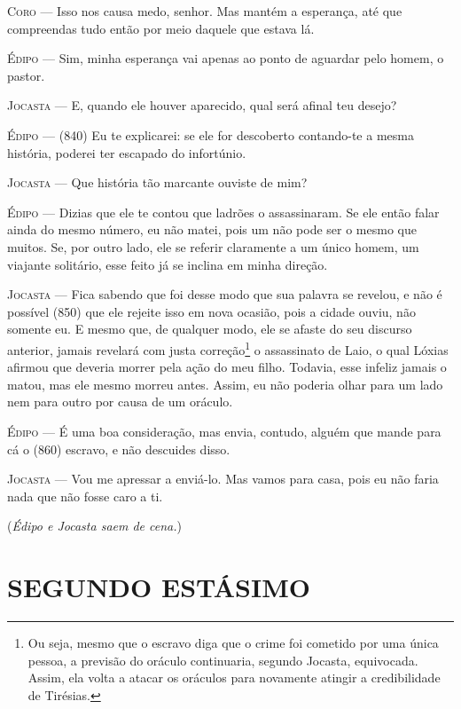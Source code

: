 \textsc{Coro} --- Isso nos causa medo, senhor. Mas mantém a esperança, até que compreendas
tudo então por meio daquele que estava lá.

\textsc{Édipo} --- Sim, minha esperança vai apenas ao ponto de aguardar pelo homem, o
pastor.

\textsc{Jocasta} --- E, quando ele houver aparecido, qual será afinal teu desejo?

\textsc{Édipo} --- (840) Eu te explicarei: se ele for descoberto contando-te a mesma
história, poderei ter escapado do infortúnio.

\textsc{Jocasta} --- Que história tão marcante ouviste de mim?

\textsc{Édipo} --- Dizias que ele te contou que ladrões o assassinaram. Se ele então falar
ainda do mesmo número, eu não matei, pois um não pode ser o mesmo que
muitos. Se, por outro lado, ele se referir claramente a um único homem,
um viajante solitário, esse feito já se inclina em minha direção.

\textsc{Jocasta} --- Fica sabendo que foi desse modo que sua palavra se revelou, e não é
possível (850) que ele rejeite isso em nova ocasião, pois a cidade
ouviu, não somente eu. E mesmo que, de qualquer modo, ele se afaste do
seu discurso anterior, jamais revelará com justa correção\footnote{Ou
  seja, mesmo que o escravo diga que o crime foi cometido por uma única
  pessoa, a previsão do oráculo continuaria, segundo Jocasta,
  equivocada. Assim, ela volta a atacar os oráculos para novamente
  atingir a credibilidade de Tirésias.} o assassinato de Laio, o qual
Lóxias afirmou que deveria morrer pela ação do meu filho. Todavia, esse
infeliz jamais o matou, mas ele mesmo morreu antes. Assim, eu não
poderia olhar para um lado nem para outro por causa de um oráculo.

\textsc{Édipo} --- É uma boa consideração, mas envia, contudo, alguém que mande para cá o
(860) escravo, e não descuides disso.

\textsc{Jocasta} --- Vou me apressar a enviá-lo. Mas vamos para casa, pois eu não faria nada
que não fosse caro a ti.

(\emph{Édipo e Jocasta saem de cena.})

\section{SEGUNDO ESTÁSIMO}

